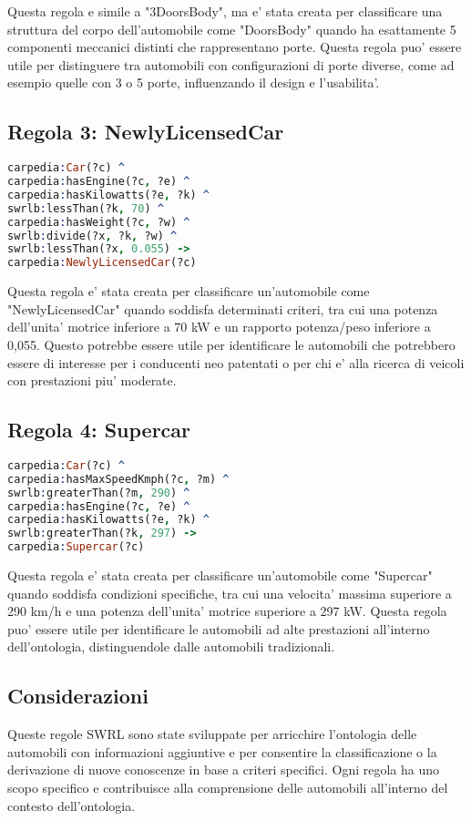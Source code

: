 Questa regola e simile a "3DoorsBody", ma e' stata creata per classificare una struttura del corpo dell'automobile
come "DoorsBody" quando ha esattamente 5 componenti meccanici distinti che rappresentano porte.
Questa regola puo' essere utile per distinguere tra automobili con configurazioni di porte diverse,
come ad esempio quelle con 3 o 5 porte, influenzando il design e l'usabilita'.

\subsection{Regola 3: NewlyLicensedCar}

\begin{lstlisting}[language=Prolog]
carpedia:Car(?c) ^
carpedia:hasEngine(?c, ?e) ^
carpedia:hasKilowatts(?e, ?k) ^
swrlb:lessThan(?k, 70) ^
carpedia:hasWeight(?c, ?w) ^
swrlb:divide(?x, ?k, ?w) ^
swrlb:lessThan(?x, 0.055) ->
carpedia:NewlyLicensedCar(?c)
\end{lstlisting}


Questa regola e' stata creata per classificare un'automobile come "NewlyLicensedCar" quando soddisfa
determinati criteri, tra cui una potenza dell'unita' motrice inferiore a 70 kW e un rapporto potenza/peso
inferiore a 0,055.
Questo potrebbe essere utile per identificare le automobili che potrebbero essere di interesse per i conducenti
neo patentati o per chi e' alla ricerca di veicoli con prestazioni piu' moderate.

\subsection{Regola 4: Supercar}

\begin{lstlisting}[language=Prolog]
carpedia:Car(?c) ^
carpedia:hasMaxSpeedKmph(?c, ?m) ^
swrlb:greaterThan(?m, 290) ^
carpedia:hasEngine(?c, ?e) ^
carpedia:hasKilowatts(?e, ?k) ^
swrlb:greaterThan(?k, 297) ->
carpedia:Supercar(?c)
\end{lstlisting}


Questa regola e' stata creata per classificare un'automobile come "Supercar" quando soddisfa condizioni
specifiche, tra cui una velocita' massima superiore a 290 km/h e una potenza dell'unita' motrice superiore a 297 kW.
Questa regola puo' essere utile per identificare le automobili ad alte prestazioni all'interno dell'ontologia,
distinguendole dalle automobili tradizionali.

\subsection{Considerazioni}
Queste regole SWRL sono state sviluppate per arricchire l'ontologia delle automobili con informazioni
aggiuntive e per consentire la classificazione o la derivazione di nuove conoscenze in base a criteri specifici.
Ogni regola ha uno scopo specifico e contribuisce alla comprensione delle automobili all'interno del contesto
dell'ontologia.


